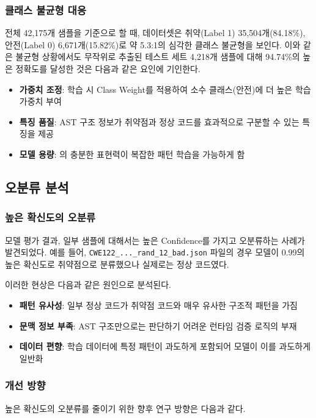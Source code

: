 \subsubsection{클래스 불균형 대응}
전체 42,175개 샘플을 기준으로 할 때, 데이터셋은 취약(Label 1) 35,504개(84.18\%), 안전(Label 0) 6,671개(15.82\%)로 약 5.3:1의 심각한 클래스 불균형을 보인다. 이와 같은 불균형 상황에서도 무작위로 추출된 테스트 세트 4,218개 샘플에 대해 94.74\%의 높은 정확도를 달성한 것은 다음과 같은 요인에 기인한다.

\begin{itemize}
    \item \textbf{가중치 조정}: 학습 시 Class Weight를 적용하여 소수 클래스(안전)에 더 높은 학습 가중치 부여
    \item \textbf{특징 품질}: AST 구조 정보가 취약점과 정상 코드를 효과적으로 구분할 수 있는 특징을 제공
\item \textbf{모델 용량}: \abbrGINE 의 충분한 표현력이 복잡한 패턴 학습을 가능하게 함
\end{itemize}

\subsection{오분류 분석}

\subsubsection{높은 확신도의 오분류}
모델 평가 결과, 일부 샘플에 대해서는 높은 Confidence를 가지고 오분류하는 사례가 발견되었다. 예를 들어, \texttt{CWE122\_...\_rand\_12\_bad.json} 파일의 경우 모델이 0.99의 높은 확신도로 취약점으로 분류했으나 실제로는 정상 코드였다.

이러한 현상은 다음과 같은 원인으로 분석된다.

\begin{itemize}
    \item \textbf{패턴 유사성}: 일부 정상 코드가 취약점 코드와 매우 유사한 구조적 패턴을 가짐
    \item \textbf{문맥 정보 부족}: AST 구조만으로는 판단하기 어려운 런타임 검증 로직의 부재
    \item \textbf{데이터 편향}: 학습 데이터에 특정 패턴이 과도하게 포함되어 모델이 이를 과도하게 일반화
\end{itemize}

\subsubsection{개선 방향}
높은 확신도의 오분류를 줄이기 위한 향후 연구 방향은 다음과 같다.

